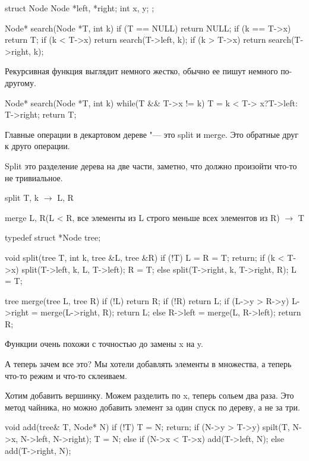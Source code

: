 \begin{cppcode}
struct Node {
     Node *left, *right;
     int x, y;
};

Node* search(Node *T, int k) {
    if (T == NULL) return NULL;
    if (k == T->x) return T; 
    if (k < T->x) return search(T->left, k);
    if (k > T->x) return search(T->right, k);
}
\end{cppcode}

Рекурсивная функция выглядит немного жестко, обычно ее пишут немного по-другому.

\begin{cppcode}
Node* search(Node *T, int k) {
    while(T && T->x != k) {
        T = k < T-> x?T->left: T->right;
    }
    return T;
}

\end{cppcode} 

Главные операции в декартовом дереве "--- это split и merge. Это обратные друг к друго операции. 

Split это разделение дерева на две части, заметно, что должно произойти что-то не тривиальное.

split T, k $\to$ L, R

merge L, R(L < R, все элементы из L строго меньше всех элементов из R) $\to$ T

\begin{cppcode}
typedef struct *Node tree;

void split(tree T, int k, tree &L, tree &R) {
    if (!T) {
        L = R = T;
        return;
    }   
    if (k < T->x) {
        split(T->left, k, L, T->left);
        R = T;
    } else {
        split(T->right, k, T->right, R);
        L = T;
    }
}

tree merge(tree L, tree R) {
    if (!L) return R;
    if (!R) return L;
    if (L->y > R->y) {
        L->right = merge(L->right, R);
        return L;
    } else {
        R->left = merge(L, R->left);
        return R;
    }
}
\end{cppcode} 

Функции очень похожи с точностью до замены x на y.

А теперь зачем все это? Мы хотели добавлять элементы в множества, а теперь что-то режим и что-то склеиваем.

Хотим добавить вершинку. Можем разделить по x, теперь сольем два раза. Это метод чайника, но можно добавить элемент за один 
спуск по дереву, а не за три. 

\begin{cppcode}
void add(tree& T, Node* N) {
    if (!T) {
        T = N;
        return;
    }
    if (N->y > T->y) {
       spilt(T, N->x, N->left, N->right);
       T = N; 
    } else if (N->x < T->x) {
        add(T->left, N);
    } else {
        add(T->right, N);
    }
}
\end{cppcode}

